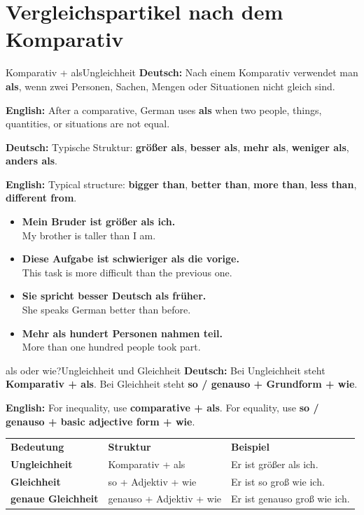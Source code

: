 \documentclass[a4paper,11pt]{article}
\newcommand{\GermanText}[1]{\textbf{Deutsch: }#1\par}
\newcommand{\EnglishText}[1]{{\small\color{SoftGray}\textbf{English: }#1\par}}
\newcommand{\ExampleItem}[2]{\item \textbf{#1}\\{\small\color{SoftGray}#2}}
\begin{document}
    \section{Vergleichspartikel nach dem Komparativ}

        \begin{grammarentry}{Komparativ + als}{Ungleichheit}
            \GermanText{Nach einem Komparativ verwendet man \textbf{als}, wenn zwei Personen, Sachen, Mengen oder Situationen nicht gleich sind.}
            \EnglishText{After a comparative, German uses \textbf{als} when two people, things, quantities, or situations are not equal.}

            \GermanText{Typische Struktur: \textbf{größer als}, \textbf{besser als}, \textbf{mehr als}, \textbf{weniger als}, \textbf{anders als}.}
            \EnglishText{Typical structure: \textbf{bigger than}, \textbf{better than}, \textbf{more than}, \textbf{less than}, \textbf{different from}.}
        \end{grammarentry}

        \begin{exbox}
            \begin{itemize}
                \ExampleItem{Mein Bruder ist größer als ich.}{My brother is taller than I am.}
                \ExampleItem{Diese Aufgabe ist schwieriger als die vorige.}{This task is more difficult than the previous one.}
                \ExampleItem{Sie spricht besser Deutsch als früher.}{She speaks German better than before.}
                \ExampleItem{Mehr als hundert Personen nahmen teil.}{More than one hundred people took part.}
            \end{itemize}
        \end{exbox}

        \begin{grammarentry}{als oder wie?}{Ungleichheit und Gleichheit}
            \GermanText{Bei Ungleichheit steht \textbf{Komparativ + als}. Bei Gleichheit steht \textbf{so / genauso + Grundform + wie}.}
            \EnglishText{For inequality, use \textbf{comparative + als}. For equality, use \textbf{so / genauso + basic adjective form + wie}.}
        \end{grammarentry}

        \begin{longtable}{>{\bfseries}p{3.2cm}|p{5.2cm}|p{6.7cm}}
            \rowcolor{HeaderBlueDark}
            \color{white}\textbf{Bedeutung} &
            \color{white}\textbf{Struktur} &
            \color{white}\textbf{Beispiel} \\
            Ungleichheit & Komparativ + als & Er ist größer als ich. \\
            Gleichheit & so + Adjektiv + wie & Er ist so groß wie ich. \\
            genaue Gleichheit & genauso + Adjektiv + wie & Er ist genauso groß wie ich. \\
        \end{longtable}
\end{document}
